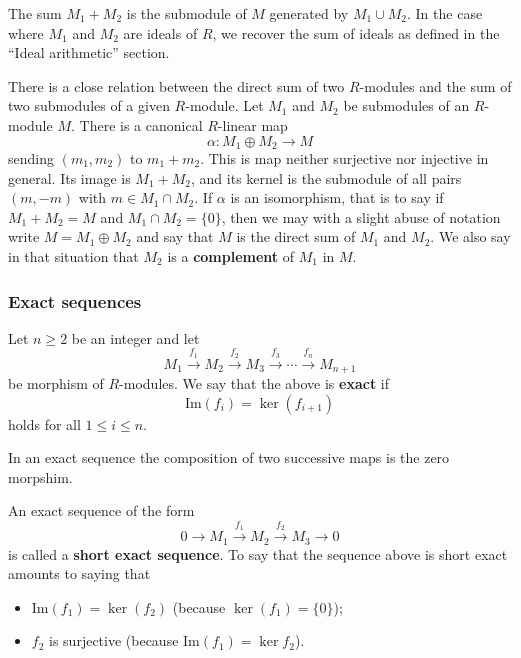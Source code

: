 \documentclass[12pt, a4paper]{article}
\begin{document}
\begin{mdexample}
    The sum \( M_1 + M_2 \) is the submodule of \( M \) generated by \( M_1 \cup M_2 \). In the case where \( M_1 \) and \( M_2 \) are ideals of \( R \), we recover the sum of ideals as defined in the ``Ideal arithmetic'' section.
\end{mdexample}

\noindent There is a close relation between the direct sum of two \( R \)-modules and the sum of two submodules of a given \( R \)-module. Let \( M_1 \) and \( M_2 \) be submodules of an \( R \)-module \( M \). There is a canonical \( R \)-linear map
\[
\alpha : M_1 \oplus M_2 \rightarrow M
\]
sending \( (m_1, m_2) \) to \( m_1 + m_2 \). This is map neither surjective nor injective in general. Its image is \( M_1 + M_2 \), and its kernel is the submodule of all pairs \( (m, -m) \) with \( m \in M_1 \cap M_2 \). If \( \alpha \) is an isomorphism, that is to say if \( M_1 + M_2 = M \) and \( M_1 \cap M_2 = \{0\} \), then we may with a slight abuse of notation write \( M = M_1 \oplus M_2 \) and say that \( M \) is the direct sum of \( M_1 \) and \( M_2 \). We also say in that situation that \( M_2 \) is a \textbf{complement} of \( M_1 \) in \( M \).


\subsubsection{Exact sequences}

\begin{definition}
    Let \(n\geq 2\) be an integer and let 
    \[M_1 \xrightarrow{f_1} M_2 \xrightarrow{f_2} M_3 \xrightarrow{f_3} \cdots \xrightarrow{f_n} M_{n+1}\]
    be morphism of \(R\)-modules. We say that the  above is \textbf{exact} if 
    \[\text{Im}(f_i) = \ker(f_{i+1})\]
    holds for all \(1 \leq i \leq n\).
\end{definition}

\begin{mdremark}
    In an exact sequence the composition of two successive maps is the zero morpshim.
\end{mdremark}

\begin{definition}
    An exact sequence of the form 
    \[0 \to M_1 \xrightarrow{f_1} M_2 \xrightarrow{f_2} M_3 \to 0\]
    is called a \textbf{short exact sequence}. 
    To say that the sequence above is short exact amounts to saying that
    \begin{itemize}
        \item \(\text{Im}(f_1)=\ker(f_2)\) (because \(\ker(f_1)=\{0\}\));
        \item \(f_2\) is surjective (because \(\text{Im}(f_1)=\ker{f_2}\)).
    \end{itemize}
\end{definition}
\end{document}
